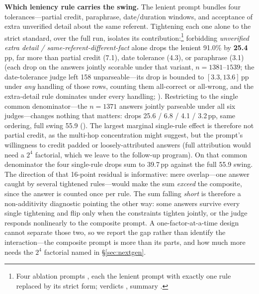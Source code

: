 \documentclass[11pt]{article}
\begin{document}
\textbf{Which leniency rule carries the swing.} The lenient prompt bundles four tolerances---partial credit, paraphrase, date/duration windows, and acceptance of extra unverified detail about the same referent. Tightening each one alone to the strict standard, over the full run, isolates its contribution:\footnote{Four ablation prompts , each the lenient prompt with exactly one rule replaced by its strict form; verdicts , summary .} forbidding \emph{unverified extra detail / same-referent-different-fact} alone drops the lenient 91.0\% by \textbf{25.4}\,pp, far more than partial credit (7.1), date tolerance (4.3), or paraphrase (3.1) (each drop on the answers jointly scorable under that variant, $n=1381$--$1539$; the date-tolerance judge left 158 unparseable---its drop is bounded to $[3.3, 13.6]$\,pp under \emph{any} handling of those rows, counting them all-correct or all-wrong, and the extra-detail rule dominates under every handling; ). Restricting to the single common denominator---the $n=1371$ answers jointly parseable under all six judges---changes nothing that matters: drops 25.6 / 6.8 / 4.1 / 3.2\,pp, same ordering, full swing 55.9 (). The largest marginal single-rule effect is therefore not partial credit, as the multi-hop concentration might suggest, but the prompt's willingness to credit padded or loosely-attributed answers (full attribution would need a $2^4$ factorial, which we leave to the follow-up program). On that common denominator the four single-rule drops sum to 39.7\,pp against the full 55.9 swing. The direction of that 16-point residual is informative: mere overlap---one answer caught by several tightened rules---would make the sum \emph{exceed} the composite, since the answer is counted once per rule. The sum falling \emph{short} is therefore a non-additivity diagnostic pointing the other way: some answers survive every single tightening and flip only when the constraints tighten jointly, or the judge responds nonlinearly to the composite prompt. A one-factor-at-a-time design cannot separate those two, so we report the gap rather than identify the interaction---the composite prompt is more than its parts, and how much more needs the $2^4$ factorial named in \S\ref{sec:nextgen}.


\end{document}
